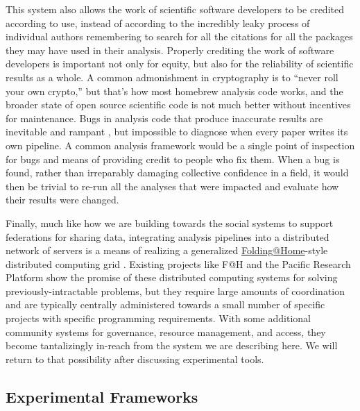 This system also allows the work of scientific software developers to be
credited according to use, instead of according to the incredibly leaky
process of individual authors remembering to search for all the
citations for all the packages they may have used in their analysis.
Properly crediting the work of software developers is important not only
for equity, but also for the reliability of scientific results as a
whole. A common admonishment in cryptography is to ``never roll your own
crypto,'' but that's how most homebrew analysis code works, and the
broader state of open source scientific code is not much better without
incentives for maintenance. Bugs in analysis code that produce
inaccurate results are inevitable and rampant \citep{millerScientistNightmareSoftware2006, soergelRampantSoftwareErrors2015, eklundClusterFailureWhy2016a, bhandarineupaneCharacterizationLeptazolinesPolar2019} , but
impossible to diagnose when every paper writes its own pipeline. A
common analysis framework would be a single point of inspection for bugs
and means of providing credit to people who fix them. When a bug is
found, rather than irreparably damaging collective confidence in a
field, it would then be trivial to re-run all the analyses that were
impacted and evaluate how their results were changed.

Finally, much like how we are building towards the social systems to
support federations for sharing data, integrating analysis pipelines
into a distributed network of servers is a means of realizing a
generalized \href{https://foldingathome.org/}{Folding@Home}-style
distributed computing grid \citep{larsonFoldingHomeGenome2009, bebergFoldingHomeLessons2009} . Existing projects like F@H and the
Pacific Research Platform \citep{smarrPacificResearchPlatform2018a}  show the promise of these distributed computing systems for solving
previously-intractable problems, but they require large amounts of
coordination and are typically centrally administered towards a small
number of specific projects with specific programming requirements. With
some additional community systems for governance, resource management,
and access, they become tantalizingly in-reach from the system we are
describing here. We will return to that possibility after discussing
experimental tools.

\hypertarget{experimental-frameworks}{%
\subsection{Experimental Frameworks}\label{experimental-frameworks}}

